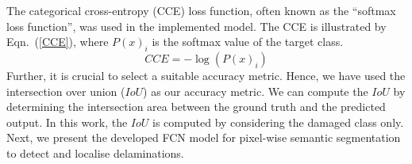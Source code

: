 \documentclass[runningheads]{llncs}
\begin{document}
The categorical cross-entropy (CCE) loss function, often known as the  \enquote{softmax loss function}, was used in the implemented model.
The CCE is illustrated by Eqn.~(\ref{CCE}), where \( P(x)_{i}\) is the  softmax value of the target class. 
\begin{equation}
	CCE = -\log\left( P(x)_{i} \right)
	\label{CCE}
\end{equation}
Further, it is crucial to select a suitable accuracy metric.
Hence, we have used the intersection over union (\(IoU\)) as our accuracy metric. 
We can compute the \(IoU\) by determining the intersection area between the ground truth and the predicted output.
In this work,  the \(IoU\) is computed by considering the damaged class only.
Next, we present the developed FCN model for pixel-wise semantic segmentation to detect and localise delaminations.
\end{document}
